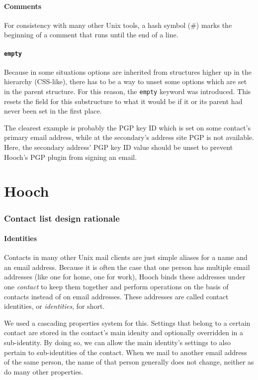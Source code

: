 \documentclass[a4paper]{article}
\begin{document}
\subsection{Comments}

For consistency with many other Unix tools, a hash symbol (\#) marks the
beginning of a comment that runs until the end of a line.

\subsection{\texttt{empty}}

Because in some situations options are inherited from structures higher
up in the hierarchy (CSS-like), there has to be a way to unset some
options which are set in the parent structure.  For this reason, the
\texttt{empty} keyword was introduced.  This resets the field for this
substructure to what it would be if it or its parent had never been set
in the first place.

The clearest example is probably the PGP key ID which is set on some
contact's primary email address, while at the secondary's address site
PGP is not available.  Here, the secondary address' PGP key ID value
should be unset to prevent Hooch's PGP plugin from signing an email.


\part{Hooch}

\section{Contact list design rationale}

\subsection{Identities}

Contacts in many other Unix mail clients are just simple aliases for a
name and an email address.  Because it is often the case that one person
has multiple email addresses (like one for home, one for work), Hooch
binds these addresses under one \emph{contact} to keep them together and
perform operations on the basis of contacts instead of on email
addresses.  These addresses are called contact identities, or
\emph{identities}, for short.

We used a cascading properties system for this.  Settings that belong to
a certain contact are stored in the contact's main idenity and
optionally overridden in a sub-identity.  By doing so, we can allow the
main identity's settings to also pertain to sub-identities of the
contact.  When we mail to another email address of the same person, the
name of that person generally does not change, neither as do many other
properties.
\end{document}
